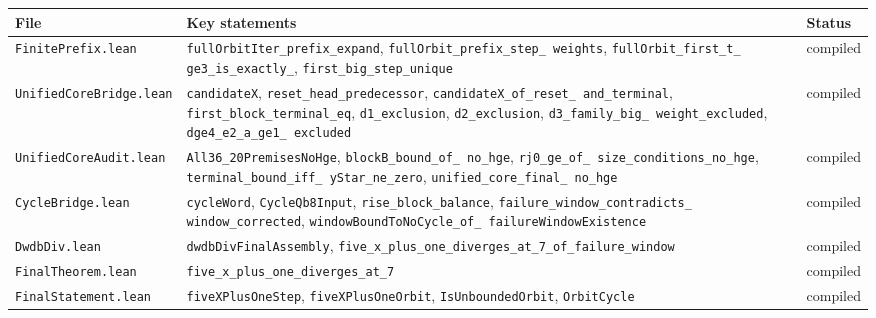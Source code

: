 \begin{center}
\scriptsize
\setlength{\tabcolsep}{4pt}
\begin{tabular}{@{}p{}p{}p{}@{}}
\toprule
File & Key statements & Status \\
\midrule
\texttt{FinitePrefix.lean} &
  \texttt{fullOrbitIter\_\allowbreak prefix\_\allowbreak expand},
  \texttt{fullOrbit\_\allowbreak prefix\_\allowbreak step\_\allowbreak
  weights},
  \texttt{fullOrbit\_\allowbreak first\_\allowbreak t\_\allowbreak
  ge3\_\allowbreak is\_\allowbreak exactly\_\allowbreak 3},
  \texttt{first\_\allowbreak big\_\allowbreak step\_\allowbreak unique}
  & compiled \\
\texttt{UnifiedCoreBridge.lean} &
  \texttt{candidateX},
  \texttt{reset\_\allowbreak head\_\allowbreak predecessor},
  \texttt{candidateX\_\allowbreak of\_\allowbreak reset\_\allowbreak
  and\_\allowbreak terminal},
  \texttt{first\_\allowbreak block\_\allowbreak terminal\_\allowbreak eq},
  \texttt{d1\_\allowbreak exclusion},
  \texttt{d2\_\allowbreak exclusion},
  \texttt{d3\_\allowbreak family\_\allowbreak big\_\allowbreak
  weight\_\allowbreak excluded},
  \texttt{dge4\_\allowbreak e2\_\allowbreak a\_\allowbreak ge1\_\allowbreak
  excluded} & compiled \\
\texttt{UnifiedCoreAudit.lean} &
  \texttt{All36\_\allowbreak 20PremisesNoHge},
  \texttt{blockB\_\allowbreak bound\_\allowbreak of\_\allowbreak
  no\_\allowbreak hge},
  \texttt{rj0\_\allowbreak ge\_\allowbreak of\_\allowbreak
  size\_\allowbreak conditions\_\allowbreak no\_\allowbreak hge},
  \texttt{terminal\_\allowbreak bound\_\allowbreak iff\_\allowbreak
  yStar\_\allowbreak ne\_\allowbreak zero},
  \texttt{unified\_\allowbreak core\_\allowbreak final\_\allowbreak
  no\_\allowbreak hge} & compiled \\
\texttt{CycleBridge.lean} &
  \texttt{cycleWord},
  \texttt{CycleQb8Input},
  \texttt{rise\_\allowbreak block\_\allowbreak balance},
  \texttt{failure\_\allowbreak window\_\allowbreak contradicts\_\allowbreak
  window\_\allowbreak corrected},
  \texttt{windowBoundToNoCycle\_\allowbreak of\_\allowbreak
  failureWindowExistence} & compiled \\
\texttt{DwdbDiv.lean} &
  \texttt{dwdbDivFinalAssembly},
  \texttt{five\_x\_plus\_one\_diverges\_at\_7\_of\_failure\_window} & compiled \\
\texttt{FinalTheorem.lean} &
  \texttt{five\_x\_plus\_one\_diverges\_at\_7} & compiled \\
\texttt{FinalStatement.lean} &
  \texttt{fiveXPlusOneStep},
  \texttt{fiveXPlusOneOrbit},
  \texttt{IsUnboundedOrbit},
  \texttt{OrbitCycle} & compiled \\
\bottomrule
\end{tabular}
\end{center}

